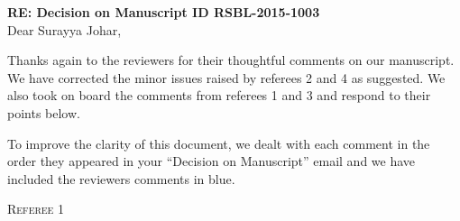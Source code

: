 \documentclass[12pt,letterpaper]{article}
\renewcommand{\section}[1]{%
\bigskip
\begin{center}
\begin{Large}
\normalfont\scshape #1
\medskip
\end{Large}
\end{center}}
\begin{document}
\textbf{RE: Decision on Manuscript ID RSBL-2015-1003}\\
\bigskip
Dear Surayya Johar,\\
\bigskip

Thanks again to the reviewers for their thoughtful comments on our manuscript.
We have corrected the minor issues raised by referees 2 and 4 as suggested.
We also took on board the comments from referees 1 and 3 and respond to their points below.

To improve the clarity of this document, we dealt with each comment in the order they appeared in your ``Decision on Manuscript'' email and we have included the reviewers comments in blue.

\section{Referee 1}
\end{document}
